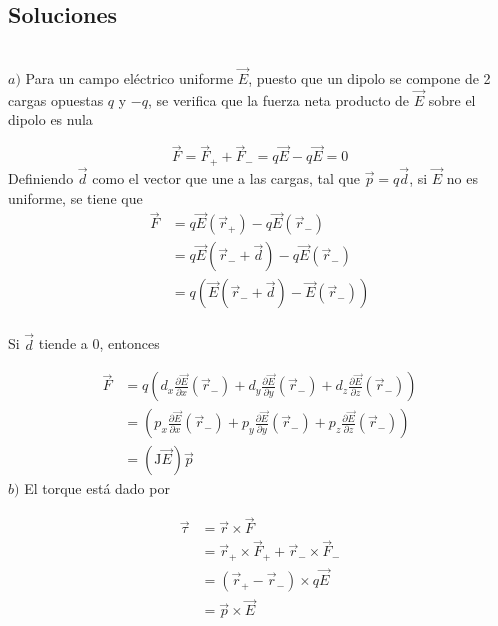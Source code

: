 \subsection{Soluciones}

\\


$a)$ Para un campo eléctrico uniforme $\Vec{E}$, puesto que un dipolo se compone de 2 cargas opuestas $q$ y $-q$, se verifica que la fuerza neta producto de $\Vec{E}$ sobre el dipolo es nula

\[\Vec{F}=\Vec{F}_{+}+\Vec{F}_{-} = q\Vec{E}-q\Vec{E}=0\]
\bigbreak
Definiendo $\Vec{d}$ como el vector que une a las cargas, tal que $\Vec{p}=q\Vec{d}$, si $\Vec{E}$ no es uniforme, se tiene que
\begin{equation}
\begin{split}
    \Vec{F} &= q\Vec{E}(\Vec{r}_{+})-q\Vec{E}(\Vec{r}_{-})\\
    &= q\Vec{E}(\Vec{r}_{-}+\Vec{d})-q\Vec{E}(\Vec{r}_{-})\\
    &= q(\Vec{E}(\Vec{r}_{-}+\Vec{d})-\Vec{E}(\Vec{r}_{-}))\\
\end{split}
\nonumber
\end{equation}

Si $\Vec{d}$ tiende a 0, entonces

\begin{equation}
\begin{split}
    \Vec{F} &= q
    \left(d_x\frac{\partial\Vec{E}}{\partial x}
    (\Vec{r}_{-})+d_y\frac{\partial\Vec{E}}{\partial y}
    (\Vec{r}_{-})+d_z\frac{\partial\Vec{E}}{\partial z}
    (\Vec{r}_{-})\right)\\
    &=\left(p_x\frac{\partial\Vec{E}}{\partial x}
    (\Vec{r}_{-})+p_y\frac{\partial\Vec{E}}{\partial y}
    (\Vec{r}_{-})+p_z\frac{\partial\Vec{E}}{\partial z}
    (\Vec{r}_{-})\right)\\
    &= (\mathrm{J}\Vec{E})\Vec{p}
\end{split}
\nonumber
\end{equation}
\bigbreak
$b)$ El torque está dado por

\begin{equation}
\begin{split}
    \Vec{\tau}&=\Vec{r}\times\Vec{F}\\
    &=\Vec{r}_{+}\times\Vec{F}_{+}+
    \Vec{r}_{-}\times\Vec{F}_{-}\\
    &=(\Vec{r}_{+}-\Vec{r}_{-})\times q\Vec{E}\\
    &= \Vec{p}\times\Vec{E}
\end{split}
\nonumber
\end{equation}
\bigbreak

